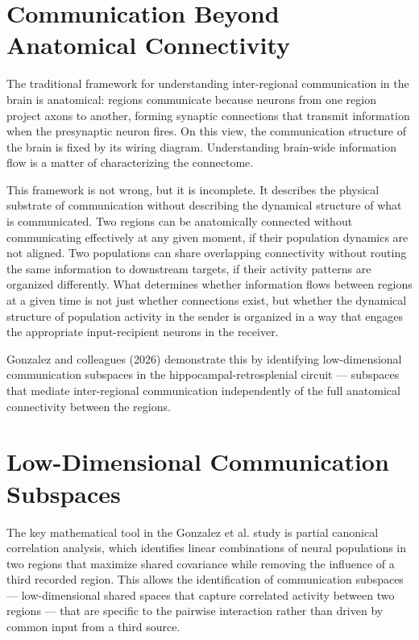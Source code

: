 \documentclass[12pt, a4paper, openany]{book}
\theoremstyle{definition}
\theoremstyle{remark}
\begin{document}
\section{Communication Beyond Anatomical Connectivity}

The traditional framework for understanding inter-regional communication in the brain is anatomical: regions communicate because neurons from one region project axons to another, forming synaptic connections that transmit information when the presynaptic neuron fires. On this view, the communication structure of the brain is fixed by its wiring diagram. Understanding brain-wide information flow is a matter of characterizing the connectome.

This framework is not wrong, but it is incomplete. It describes the physical substrate of communication without describing the dynamical structure of what is communicated. Two regions can be anatomically connected without communicating effectively at any given moment, if their population dynamics are not aligned. Two populations can share overlapping connectivity without routing the same information to downstream targets, if their activity patterns are organized differently. What determines whether information flows between regions at a given time is not just whether connections exist, but whether the dynamical structure of population activity in the sender is organized in a way that engages the appropriate input-recipient neurons in the receiver.

Gonzalez and colleagues (2026) demonstrate this by identifying low-dimensional communication subspaces in the hippocampal-retrosplenial circuit — subspaces that mediate inter-regional communication independently of the full anatomical connectivity between the regions.

\section{Low-Dimensional Communication Subspaces}

The key mathematical tool in the Gonzalez et al. study is partial canonical correlation analysis, which identifies linear combinations of neural populations in two regions that maximize shared covariance while removing the influence of a third recorded region. This allows the identification of communication subspaces — low-dimensional shared spaces that capture correlated activity between two regions — that are specific to the pairwise interaction rather than driven by common input from a third source.
\end{document}
